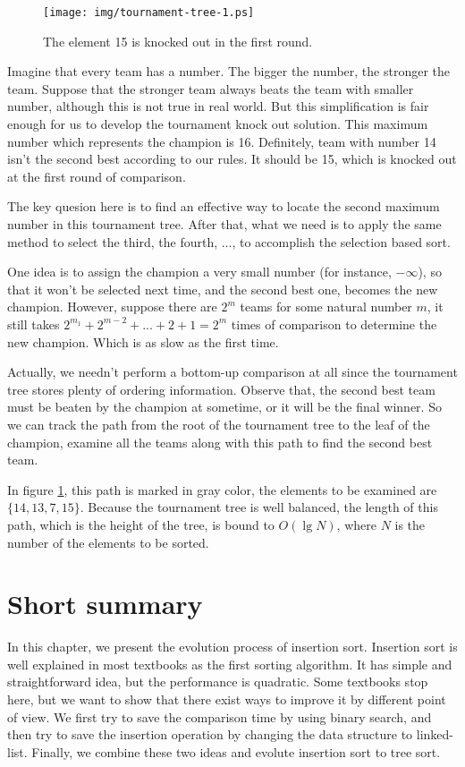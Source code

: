 \documentclass{article}
\begin{document}
\begin{figure}[htbp]
  \centering
  \texttt{[image: img/tournament-tree-1.ps]}
  \caption{The element 15 is knocked out in the first round.}
  \label{fig:tournament-tree-1}
\end{figure}

Imagine that every team has a number. The bigger the number, the stronger the team. Suppose
that the stronger team always beats the team with smaller number, although this is not true
in real world. But this simplification is fair enough for us to develop the tournament knock
out solution. This maximum number which represents the champion is 16. Definitely, team with
number 14 isn't the second best according to our rules. It should be 15, which is knocked
out at the first round of comparison.

The key quesion here is to find an effective way to locate the second maximum number in this
tournament tree. After that, what we need is to apply the same method to select the third,
the fourth, ..., to accomplish the selection based sort.

One idea is to assign the champion a very small number (for instance, $-\infty$), 
so that it won't be selected next time, and the second best one, becomes the new champion.
However, suppose there are $2^m$ teams for some natural number $m$, it still takes 
$2^{m_1} + 2^{m-2} + ... + 2 + 1 = 2^m$ times of comparison to determine the new 
champion. Which is as slow as the first time.

Actually, we needn't perform a bottom-up comparison at all since the tournament tree
stores plenty of ordering information. Observe that, the second best team must
be beaten by the champion at sometime, or it will be the final winner. So we
can track the path from the root of the tournament tree to the leaf of the
champion, examine all the teams along with this path to find the second best team.

In figure \ref{fig:tournament-tree-1}, this path is marked in gray color, the elements
to be examined are $\{14, 13, 7, 15\}$. Because the tournament tree is well balanced,
the length of this path, which is the height of the tree, is bound to $O(\lg N)$,
where $N$ is the number of the elements to be sorted.

\section{Short summary} 
In this chapter, we present the evolution process of insertion sort. Insertion
sort is well explained in most textbooks as the first sorting algorithm.
It has simple and straightforward idea, but the performance is quadratic.
Some textbooks stop here, but we want to show that there exist ways to improve
it by different point of view. We first try to save the comparison time
by using binary search, and then try to save the insertion operation by
changing the data structure to linked-list. Finally, we combine these
two ideas and evolute insertion sort to tree sort.
\end{document}
